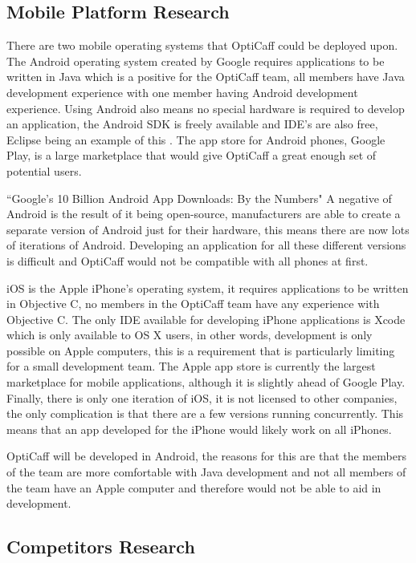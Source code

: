 \subsection{Mobile Platform Research}
There are two mobile operating systems that OptiCaff could be deployed upon. The Android operating system created by Google requires applications to be written in Java which is a positive for the OptiCaff team, all members have Java development experience with one member having Android development experience. Using Android also means no special hardware is required to develop an application, the Android SDK is freely available and IDE’s are also free, Eclipse being an example of this \cite{Eclipse}. The app store for Android phones, Google Play, is a large marketplace that would give OptiCaff a great enough set of potential users.

``Google’s 10 Billion Android App Downloads: By the Numbers" \newline
A negative of Android is the result of it being open-source, manufacturers are able to create a separate version of Android just for their hardware, this means there are now lots of iterations of Android. Developing an application for all these different versions is difficult and OptiCaff would not be compatible with all phones at first.

iOS is the Apple iPhone’s operating system, it requires applications to be written in Objective C, no members in the OptiCaff team have any experience with Objective C. The only IDE available for developing iPhone applications is Xcode which is only available to OS X users, in other words, development is only possible on Apple computers, this is a requirement that is particularly limiting for a small development team. The Apple app store is currently the largest marketplace for mobile applications, although it is slightly ahead of Google Play. Finally, there is only one iteration of iOS, it is not licensed to other companies, the only complication is that there are a few versions running concurrently. This means that an app developed for the iPhone would likely work on all iPhones.

OptiCaff will be developed in Android, the reasons for this are that the members of the team are more comfortable with Java development and not all members of the team have an Apple computer and therefore would not be able to aid in development.

\subsection{Competitors Research}
\label{sec:Competitors}


